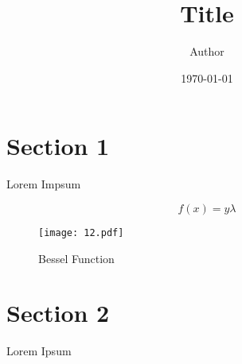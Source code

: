 \documentclass[11pt]{article}
\title{ Title}
\author{ Author }
\date{\today}
\begin{document}
\maketitle
\pagebreak



\section{Section 1}

Lorem Impsum

\begin{equation}
    f(x) = y \lambda
\end{equation}

\begin{figure}[!ht]
  \centering
  \texttt{[image: 12.pdf]}
  \caption{Bessel Function}
\end{figure}

\pagebreak
\section{Section 2}
Lorem Ipsum \\

\end{document}
